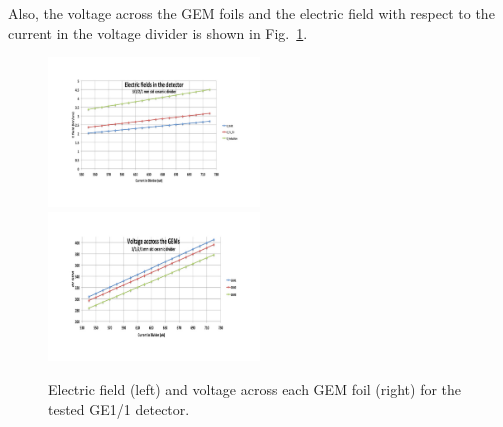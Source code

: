 Also, the voltage across the GEM foils and  the electric field  with respect to the current in the voltage divider is shown in Fig.~\ref{fig:GEM_voltage_electricfield}. 
\begin{figure}[!htbp]
    \centering
    \includegraphics[width=0.5\textwidth]{figures/GEM/GE11_IV_ElectricField_detector.pdf}%
    \includegraphics[width=0.5\textwidth]{figures/GEM/GE11_IV_VoltageAcross_GEM.pdf}
    \caption{Electric field (left) and voltage across each GEM foil (right) for the tested GE1/1 detector.}
    \label{fig:GEM_voltage_electricfield}
\end{figure}

